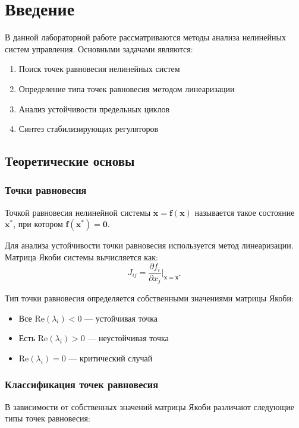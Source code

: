 \section*{Введение}

В данной лабораторной работе рассматриваются методы анализа нелинейных систем управления. Основными задачами являются:

\begin{enumerate}
\item Поиск точек равновесия нелинейных систем
\item Определение типа точек равновесия методом линеаризации
\item Анализ устойчивости предельных циклов
\item Синтез стабилизирующих регуляторов
\end{enumerate}

\subsection*{Теоретические основы}

\subsubsection*{Точки равновесия}

Точкой равновесия нелинейной системы $\dot{\mathbf{x}} = \mathbf{f}(\mathbf{x})$ называется такое состояние $\mathbf{x}^*$, при котором $\mathbf{f}(\mathbf{x}^*) = \mathbf{0}$.

Для анализа устойчивости точки равновесия используется метод линеаризации. Матрица Якоби системы вычисляется как:
$$J_{ij} = \frac{\partial f_i}{\partial x_j}\bigg|_{\mathbf{x} = \mathbf{x}^*}$$

Тип точки равновесия определяется собственными значениями матрицы Якоби:
\begin{itemize}
\item Все $\text{Re}(\lambda_i) < 0$ --- устойчивая точка
\item Есть $\text{Re}(\lambda_i) > 0$ --- неустойчивая точка
\item $\text{Re}(\lambda_i) = 0$ --- критический случай
\end{itemize}

\subsubsection*{Классификация точек равновесия}

В зависимости от собственных значений матрицы Якоби различают следующие типы точек равновесия:

